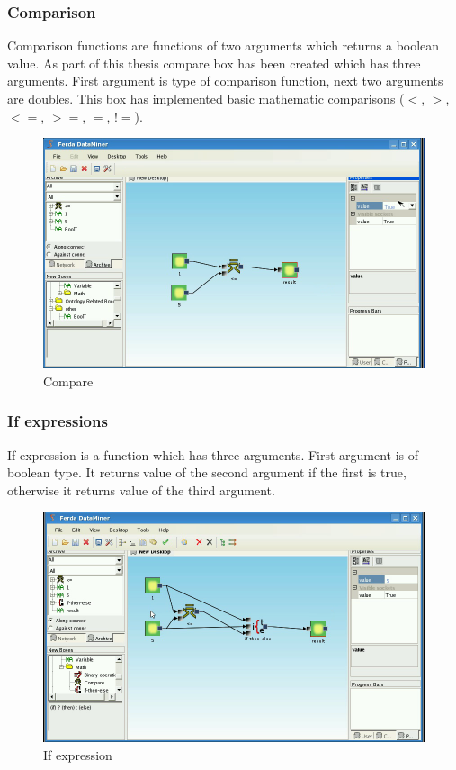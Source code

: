 \documentclass[a4paper,12pt]{book}
\begin{document}
\subsubsection{Comparison}
Comparison functions are functions of two arguments which returns a boolean value. As part of this thesis compare box has been created which has three arguments. First argument is type of comparison function, next two arguments are doubles. This box has implemented basic mathematic comparisons ($<$, $>$, $<=$, $>=$, $=$, $!=$).
\begin{figure}
\includegraphics[width=13.72cm]{compare2.png}
	\caption{Compare}
\end{figure}

\subsubsection{If expressions}
If expression is a function which has three arguments. First argument is of boolean type. It returns value of the second argument if the first is true, otherwise it returns value of the third argument.
\begin{figure}
\includegraphics[width=13.72cm]{ifthenelse2.png}
	\caption{If expression}
\end{figure}
\end{document}

